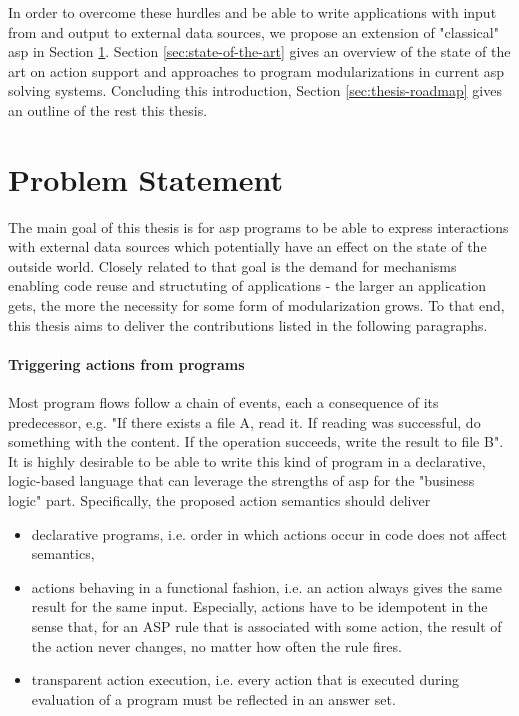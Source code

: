 In order to overcome these hurdles and be able to write applications with input from and output to external data sources, we propose an extension of "classical" \gls{asp} in Section \ref{sec:problem-statement}. Section \ref{sec:state-of-the-art} gives an overview of the state of the art on action support and approaches to program modularizations in current \gls{asp} solving systems. Concluding this introduction, Section \ref{sec:thesis-roadmap} gives an outline of the rest this thesis.

\section{Problem Statement}
\label{sec:problem-statement}

The main goal of this thesis is for \gls{asp} programs to be able to express interactions with external data sources which potentially have an effect on the state of the outside world. Closely related to that goal is the demand for mechanisms enabling code reuse and structuting of applications - the larger an application gets, the more the necessity for some form of modularization grows. To that end, this thesis aims to deliver the contributions listed in the following paragraphs.

\paragraph{Triggering actions from programs} \label{goals:actions}Most program flows follow a chain of events, each a consequence of its predecessor, e.g. "If there exists a file A, read it. If reading was successful, do something with the content. If the operation succeeds, write the result to file B". It is highly desirable to be able to write this kind of program in a declarative, logic-based language that can leverage the strengths of \gls{asp} for the "business logic" part. Specifically, the proposed action semantics should deliver
\begin{itemize}
    \item declarative programs, i.e. order in which actions occur in code does not affect semantics,
    \item actions behaving in a functional fashion, i.e. an action always gives the same result for the same input. Especially, actions have to be idempotent in the sense that, for an ASP rule that is associated with some action, the result of the action never changes, no matter how often the rule fires.
    \item transparent action execution, i.e. every action that is executed during evaluation of a program must be reflected in an answer set.
\end{itemize}

